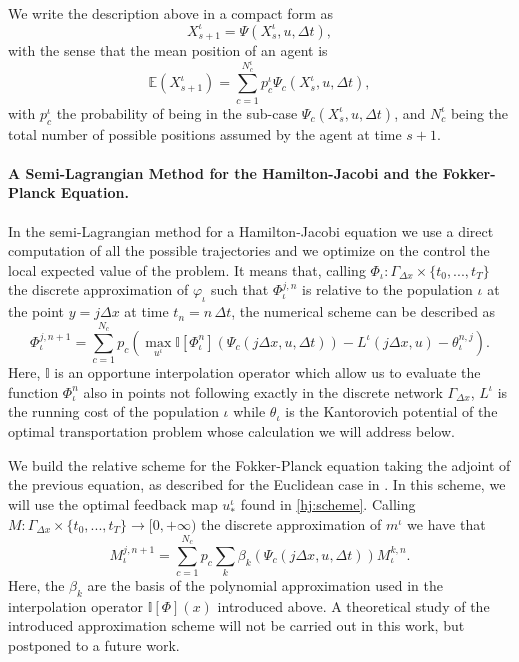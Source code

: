 \documentclass[smallextended,referee,envcountsect,]{svjour3}
\renewcommand{\phi}{\varphi}
\begin{document}
We write the description above in a compact form as 
$$ X^\iota_{s+1}=\Psi(X^\iota_s,u,\Delta t), $$
with the sense that the mean position of an agent is
$$ \mathbb E (X^\iota_{s+1})=\sum_{c=1}^{N^\iota_c} p^\iota_c \Psi_c(X^\iota_s,u,\Delta t), $$
with $p^\iota_c$ the probability of being in the sub-case $\Psi_c(X^\iota_s,u,\Delta t)$, and $N^\iota_c$ being the total number of possible positions assumed by the agent at time $s+1$. 

\paragraph{A Semi-Lagrangian Method for the Hamilton-Jacobi and the Fokker-Planck Equation.}
In the semi-Lagrangian method for a Hamilton-Jacobi equation we use a direct computation of all the possible trajectories and we optimize on the control the local expected value of the problem. It means that, calling $\Phi_\iota:\Gamma_{\Delta x}\times \{t_0,...,t_T\}$ the discrete approximation of $\phi_\iota$ such that $\Phi_\iota^{j,n}$ is relative to the population $\iota$ at the point $y=j\Delta x$ at time $t_n=n\,\Delta t$, the numerical scheme can be described as 
\begin{equation}\label{hj:scheme}
\Phi^{j,n+1}_\iota=\sum_{c=1}^{N_c} p_c \left(\max_{u^\iota} \mathbb I[\Phi_\iota^{n}](\Psi_c(j\Delta x,u,\Delta t))-L^\iota(j\Delta x,u)-\theta_\iota^{n,j}\right).
\end{equation}
Here, $\mathbb I$ is an opportune interpolation operator which allow us to evaluate the function $\Phi^{n}_\iota$ also in points not following exactly in the discrete network $\Gamma_{\Delta x}$, $L^\iota$ is the running cost of the population $\iota$ while $\theta_\iota$ is the Kantorovich potential of the optimal transportation problem whose calculation we will address below. 

We build the relative scheme for the Fokker-Planck equation taking the adjoint of the previous equation,  as described for the Euclidean case in \cite{CS17}. In this scheme, we will use the optimal feedback map $u^\iota_*$ found in \eqref{hj:scheme}. Calling $M:\Gamma_{\Delta x}\times \{t_0,...,t_T\}\rightarrow [0,+\infty)$ the discrete approximation of $m^\iota$ we have that 
\begin{equation*}
M_\iota^{j,n+1}=\sum_{c=1}^{N_c} p_c \sum_{k}\beta_{k}(\Psi_c(j\Delta x,u,\Delta t)) M_\iota^{k,n}.
\end{equation*}
Here, the $\beta_{k}$ are the basis of the polynomial approximation used in the interpolation operator $\mathbb I[\Phi](x)$ introduced above. A theoretical study of the introduced approximation scheme will not be carried out in this work, but postponed to a future work.\\
\end{document}
